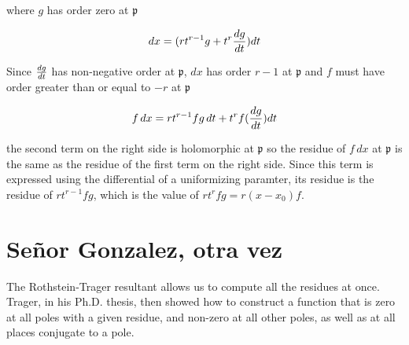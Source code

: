 where $g$ has order zero at $\mathfrak{p}$

$$dx = (rt^{r-1}g + t^r{{dg}\over{dt}})dt$$

Since ${dg}\over{dt}$ has non-negative order at $\mathfrak{p}$,
$dx$ has order $r-1$ at $\mathfrak{p}$ and $f$ must have order
greater than or equal to $-r$ at $\mathfrak{p}$

$$f\,dx = rt^{r-1}f g\, dt + t^rf({{dg}\over{dt}})dt$$

the second term on the right side is holomorphic at $\mathfrak{p}$ so
the residue of $f\,dx$ at $\mathfrak{p}$ is the same as the residue of
the first term on the right side.  Since this term is expressed using
the differential of a uniformizing paramter, its residue is the
residue of $rt^{r-1}fg$, which is the value of $rt^rfg = r(x-x_0)f$.

\endtheorem

\vfill\eject
\section{Se\~nor Gonzalez, otra vez}

The Rothstein-Trager resultant allows us to compute all the residues
at once.  Trager, in his Ph.D. thesis, then showed how to construct a
function that is zero at all poles with a given residue, and non-zero
at all other poles, as well as at all places conjugate to a pole.
